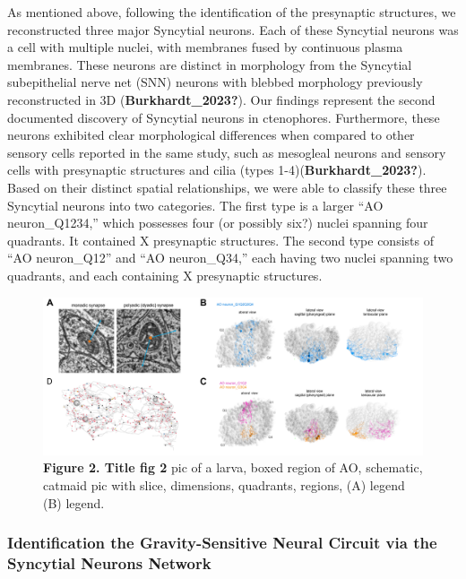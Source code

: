 \documentclass[
  11pt,
]{article}
\begin{document}
As mentioned above, following the identification of the presynaptic
structures, we reconstructed three major Syncytial neurons. Each of
these Syncytial neurons was a cell with multiple nuclei, with membranes
fused by continuous plasma membranes. These neurons are distinct in
morphology from the Syncytial subepithelial nerve net (SNN) neurons with
blebbed morphology previously reconstructed in 3D
(\textbf{Burkhardt\_2023?}). Our findings represent the second
documented discovery of Syncytial neurons in ctenophores. Furthermore,
these neurons exhibited clear morphological differences when compared to
other sensory cells reported in the same study, such as mesogleal
neurons and sensory cells with presynaptic structures and cilia (types
1-4)(\textbf{Burkhardt\_2023?}). Based on their distinct spatial
relationships, we were able to classify these three Syncytial neurons
into two categories. The first type is a larger ``AO neuron\_Q1234,''
which possesses four (or possibly six?) nuclei spanning four quadrants.
It contained X presynaptic structures. The second type consists of ``AO
neuron\_Q12'' and ``AO neuron\_Q34,'' each having two nuclei spanning
two quadrants, and each containing X presynaptic structures.

\begin{figure}[H]

{\centering \includegraphics[width=1\textwidth,height=\textheight]{figures/Figure2.png}

}

\caption{\textbf{Figure 2. Title fig 2} pic of a larva, boxed region of
AO, schematic, catmaid pic with slice, dimensions, quadrants, regions,
(A) legend (B) legend.}

\end{figure}%

\subsubsection{Identification the Gravity-Sensitive Neural Circuit via
the Syncytial Neurons
Network}\label{identification-the-gravity-sensitive-neural-circuit-via-the-syncytial-neurons-network}
\end{document}
